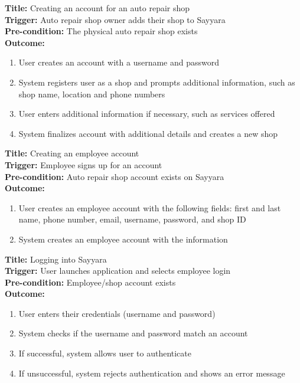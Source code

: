 \documentclass[12pt]{article}
\begin{document}
\textbf{Title:} Creating an account for an auto repair shop\\
\textbf{Trigger:} Auto repair shop owner adds their shop to Sayyara\\
\textbf{Pre-condition:} The physical auto repair shop exists\\
\textbf{Outcome:}
\begin{enumerate}
	\item User creates an account with a username and password
	\item System registers user as a shop and prompts additional information, such as shop name, location and
	      phone numbers
	\item User enters additional information if necessary, such as services offered
	\item System finalizes account with additional details and creates a new shop
\end{enumerate}

\textbf{Title:} Creating an employee account\\
\textbf{Trigger:} Employee signs up for an account\\
\textbf{Pre-condition:} Auto repair shop account exists on Sayyara\\
\textbf{Outcome:}
\begin{enumerate}
	\item User creates an employee account with the following fields: first and last name, phone number,
	      email, username, password, and shop ID
	\item System creates an employee account with the information
\end{enumerate}

\textbf{Title:} Logging into Sayyara\\
\textbf{Trigger:} User launches application and selects employee login\\
\textbf{Pre-condition:} Employee/shop account exists\\
\textbf{Outcome:}
\begin{enumerate}
	\item User enters their credentials (username and password)
	\item System checks if the username and password match an account
	\item If successful, system allows user to authenticate
	\item If unsuccessful, system rejects authentication and shows an error message
\end{enumerate}
\end{document}
